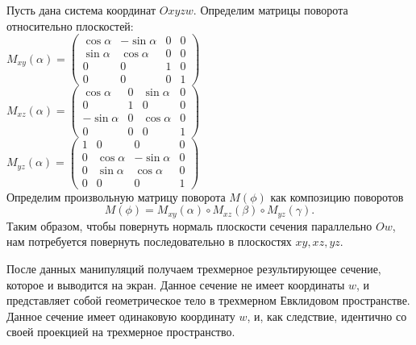 \documentclass[12pt, a4paper, twoside]{report}
\begin{document}
Пусть дана система координат $Oxyzw$. Определим матрицы поворота относительно плоскостей:
\\

$
M_{xy}(\alpha)=
\begin{equation}
	\left(
		\begin{array}{cccc}
		\cos \alpha & -\sin \alpha & 0 & 0 \\
		\sin \alpha & \cos \alpha & 0 & 0 \\
		0 & 0 & 1 & 0 \\
		0 & 0 & 0 & 1
	\end{array}\right)
\end{equation}
$
\\ 

$
M_{xz}(\alpha)=
\begin{equation}
	\left(
		\begin{array}{cccc}
		\cos \alpha & 0 & \sin \alpha & 0 \\
		0 & 1 & 0 & 0 \\
		-\sin \alpha & 0 & \cos \alpha & 0 \\
		0 & 0 & 0 & 1
	\end{array}\right)
\end{equation}
$
\\

$
M_{yz}(\alpha)=
\begin{equation}
	\left(
		\begin{array}{cccc}
		1 & 0 & 0 & 0 \\
		0 & \cos \alpha & -\sin \alpha & 0 \\
		0 & \sin \alpha & \cos \alpha & 0 \\
		0 & 0 & 0 & 1
	\end{array}\right)
\end{equation}
$
\\

Определим произвольную матрицу поворота $M(\phi)$ как композицию поворотов $$M(\phi)=M_{xy}(\alpha)\circ M_{xz}(\beta)\circ M_{yz}(\gamma).$$
Таким образом, чтобы повернуть нормаль плоскости сечения параллельно $Ow$, нам потребуется повернуть последовательно в плоскостях $xy, xz, yz$.

После данных манипуляций получаем трехмерное результирующее сечение, которое и выводится на экран. Данное сечение не имеет координаты $w$, и представляет собой геометрическое тело в трехмерном Евклидовом пространстве.
Данное сечение имеет одинаковую координату $w$, и, как следствие, идентично со своей проекцией на трехмерное пространство.
\newpage
\end{document}
